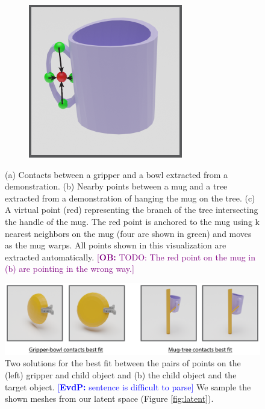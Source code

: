 \documentclass{article}
\newcommand{\ob}[1]{\textcolor{purple}{[\textbf{OB:} #1]}}
\newcommand{\evdp}[1]{\textcolor{blue}{[\textbf{EvdP:} #1]}}
\begin{document}
\begin{figure}
\begin{subfigure}[b]{0.25\textwidth}
        \caption{}
    \end{subfigure}
    \hspace{0.05\textwidth}
    \begin{subfigure}[b]{0.25\textwidth}
        \centering
        \includegraphics[width=\textwidth]{figures/contact_fig2.pdf}
        \caption{}
    \end{subfigure}
    \caption{(a) Contacts between a gripper and a bowl extracted from a demonstration. (b) Nearby points between a mug and a tree extracted from a demonstration of hanging the mug on the tree. (c) A virtual point (red) representing the branch of the tree intersecting the handle of the mug. The red point is anchored to the mug using k nearest neighbors on the mug (four are shown in green) and moves as the mug warps. All points shown in this visualization are extracted automatically. \ob{TODO: The red point on the mug in (b) are pointing in the wrong way.}}
    \label{fig:contacts}
\end{figure}

\begin{figure}
    \centering
    \includegraphics[width=\textwidth]{figures/picks_and_places.pdf}
    \caption{Two solutions for the best fit between the pairs of points on the (left) gripper and child object and (b) the child object and the target object. \evdp{sentence is difficult to parse} We sample the shown meshes from our latent space (Figure \ref{fig:latent}).}
    \label{fig:grasps_and_placements}
\end{figure}
\end{document}

